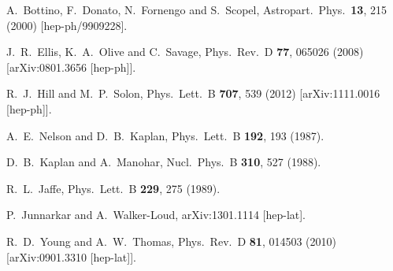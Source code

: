 \begin{thebibliography}{99}
  A.~Bottino, F.~Donato, N.~Fornengo and S.~Scopel,
  Astropart.\ Phys.\  {\bf 13}, 215 (2000)
  [hep-ph/9909228].

  J.~R.~Ellis, K.~A.~Olive and C.~Savage,
  Phys.\ Rev.\ D {\bf 77}, 065026 (2008)
  [arXiv:0801.3656 [hep-ph]].

  R.~J.~Hill and M.~P.~Solon,
  Phys.\ Lett.\ B {\bf 707}, 539 (2012)
  [arXiv:1111.0016 [hep-ph]].

  A.~E.~Nelson and D.~B.~Kaplan,
  Phys.\ Lett.\ B {\bf 192}, 193 (1987).

  D.~B.~Kaplan and A.~Manohar,
  Nucl.\ Phys.\ B {\bf 310}, 527 (1988).

  R.~L.~Jaffe,
  Phys.\ Lett.\ B {\bf 229}, 275 (1989).
  
  P.~Junnarkar and A.~Walker-Loud,
  arXiv:1301.1114 [hep-lat].

  R.~D.~Young and A.~W.~Thomas,
  Phys.\ Rev.\ D {\bf 81}, 014503 (2010)
  [arXiv:0901.3310 [hep-lat]].


\end{thebibliography}
